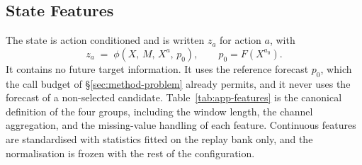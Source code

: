 \documentclass{article}
\begin{document}
\subsection{State Features}
\label{app:features}
The state is action conditioned and is written $z_a$ for action $a$, with
\begin{equation}
  z_a \;=\; \phi\!\left(X,\, M,\, X^{a},\, p_0\right),
  \qquad p_0 = F(X^{a_0}) .
  \label{eq:app-state}
\end{equation}
It contains no future target information. It uses the reference forecast $p_0$, which the
call budget of \S\ref{sec:method-problem} already permits, and it never uses the forecast of a
non-selected candidate. Table~\ref{tab:app-features} is the canonical definition of the four
groups, including the window length, the channel aggregation, and the missing-value handling
of each feature. Continuous features are standardised with statistics fitted on the replay
bank only, and the normalisation is frozen with the rest of the configuration.
\end{document}
